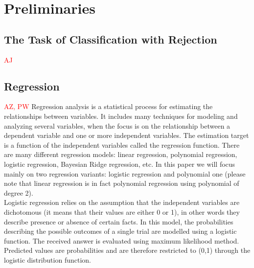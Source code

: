 \documentclass{llncs}
\begin{document}
\section{Preliminaries}
  \label{sec:preliminaries}

\subsection{The Task of Classification with Rejection}
\textcolor{red} {AJ}


\subsection{Regression}
\textcolor{red} {AZ, PW}
Regression analysis is a statistical process for estimating the relationships between variables. It includes many techniques for modeling and analyzing several variables, when the focus is on the relationship between a dependent variable and one or more independent variables. The estimation target is a function of the independent variables called the regression function. There are many different regression models: linear regression, polynomial regression, logistic regression, Bayesian Ridge regression, etc. In this paper we will focus mainly on two regression variants: logistic regression and polynomial one (please note that linear regression is in fact polynomial regression using polynomial of degree 2). \\

Logistic regression relies on the assumption that the independent variables are dichotomous (it means that their values are either 0 or 1), in other words they describe presence or absence of certain facts. In this model, the probabilities describing the possible outcomes of a single trial are modelled using a logistic function. The received answer is evaluated using maximum likelihood method. Predicted values are probabilities and are therefore restricted to (0,1) through the logistic distribution function. \\ %
\end{document}
